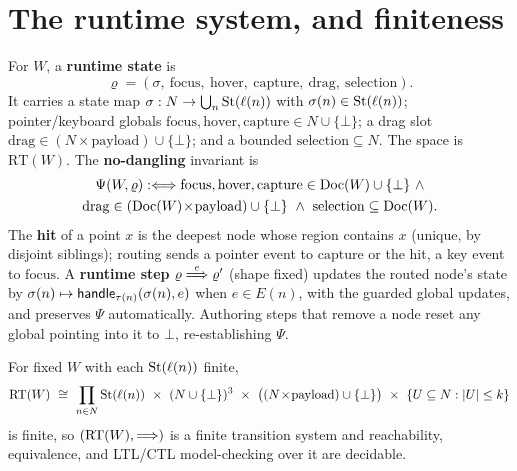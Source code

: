 \documentclass[../uxoxo-main]{subfiles}
\begin{document}
\section{The runtime system, and finiteness}\label{sec:runtime}
\begin{definition}\label{def:runtime}
For $W$, a \textbf{runtime state} is
\[
  \varrho=(\sigma,\ \mathrm{focus},\ \mathrm{hover},\ \mathrm{capture},\
  \mathrm{drag},\ \mathrm{selection}).
\]
It carries a state map $\sigma:N\to\bigcup_n\mathrm{St}(\ell(n))$
with $\sigma(n)\in\mathrm{St}(\ell(n))$; pointer/keyboard globals
$\mathrm{focus},\mathrm{hover},\mathrm{capture}\in N\cup\{\bot\}$; a drag slot
$\mathrm{drag}\in(N\times\mathrm{payload})\cup\{\bot\}$; and a bounded
$\mathrm{selection}\subseteq N$. The space is $\mathrm{RT}(W)$. The
\textbf{no-dangling} invariant is
\begin{multline*}
  \Psi(W,\varrho)\coloniff
  \mathrm{focus},\mathrm{hover},\mathrm{capture}\in\Doc(W)\cup\{\bot\}\ \wedge\\
  \mathrm{drag}\in(\Doc(W)\!\times\!\mathrm{payload})\cup\{\bot\}\ \wedge\
  \mathrm{selection}\subseteq\Doc(W).
\end{multline*}
The \textbf{hit} of a point $x$ is the deepest node whose region contains $x$
(unique, by disjoint siblings); routing sends a pointer event to
$\mathrm{capture}$ or the hit, a key event to $\mathrm{focus}$. A
\textbf{runtime step} $\varrho\overset{e}{\Longrightarrow}\varrho'$ (shape fixed) updates the
routed node's state by $\sigma(n)\mapsto\mathsf{handle}_{\tau(n)}(\sigma(n),e)$ when
$e\in E(n)$, with the guarded global updates, and preserves $\Psi$
automatically. Authoring steps that remove a node reset any global pointing into
it to $\bot$, re-establishing $\Psi$.
\end{definition}

\begin{theorem}\label{thm:fin}
For fixed $W$ with each $\mathrm{St}(\ell(n))$ finite,
\[
  \mathrm{RT}(W)\ \cong\ \prod_{n\in N}\St(\ell(n))\ \times\
  (N\cup\{\bot\})^{3}\ \times\ \bigl((N\!\times\!\mathrm{payload})\cup\{\bot\}\bigr)
  \ \times\ \{U\subseteq N:\lvert U\rvert\le k\}
\]
is finite, so $(\mathrm{RT}(W),\overset{}{\Longrightarrow})$ is a finite transition system and
reachability, equivalence, and LTL/CTL model-checking over it are decidable.
\end{theorem}
\end{document}

